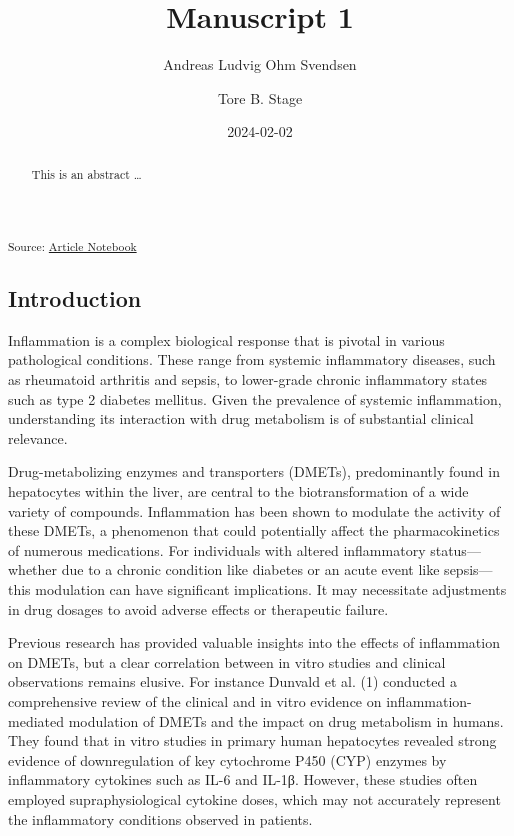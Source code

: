 \documentclass[
  letterpaper,
  DIV=11,
  numbers=noendperiod,
  oneside]{scrartcl}
\title{Manuscript 1}
\author{Andreas Ludvig Ohm Svendsen \and Tore B. Stage}
\date{2024-02-02}
\begin{document}
\maketitle
\begin{abstract}
This is an abstract \ldots{}
\end{abstract}

\textsubscript{Source:
\href{https://andreasludvig.github.io/manuscript/index.qmd.html}{Article
Notebook}}

\subsection{Introduction}\label{introduction}

Inflammation is a complex biological response that is pivotal in various
pathological conditions. These range from systemic inflammatory
diseases, such as rheumatoid arthritis and sepsis, to lower-grade
chronic inflammatory states such as type 2 diabetes mellitus. Given the
prevalence of systemic inflammation, understanding its interaction with
drug metabolism is of substantial clinical relevance.

Drug-metabolizing enzymes and transporters (DMETs), predominantly found
in hepatocytes within the liver, are central to the biotransformation of
a wide variety of compounds. Inflammation has been shown to modulate the
activity of these DMETs, a phenomenon that could potentially affect the
pharmacokinetics of numerous medications. For individuals with altered
inflammatory status---whether due to a chronic condition like diabetes
or an acute event like sepsis---this modulation can have significant
implications. It may necessitate adjustments in drug dosages to avoid
adverse effects or therapeutic failure.

Previous research has provided valuable insights into the effects of
inflammation on DMETs, but a clear correlation between in vitro studies
and clinical observations remains elusive. For instance Dunvald et al.
(1) conducted a comprehensive review of the clinical and in vitro
evidence on inflammation-mediated modulation of DMETs and the impact on
drug metabolism in humans. They found that in vitro studies in primary
human hepatocytes revealed strong evidence of downregulation of key
cytochrome P450 (CYP) enzymes by inflammatory cytokines such as IL-6 and
IL-1β. However, these studies often employed supraphysiological cytokine
doses, which may not accurately represent the inflammatory conditions
observed in patients.
\end{document}
